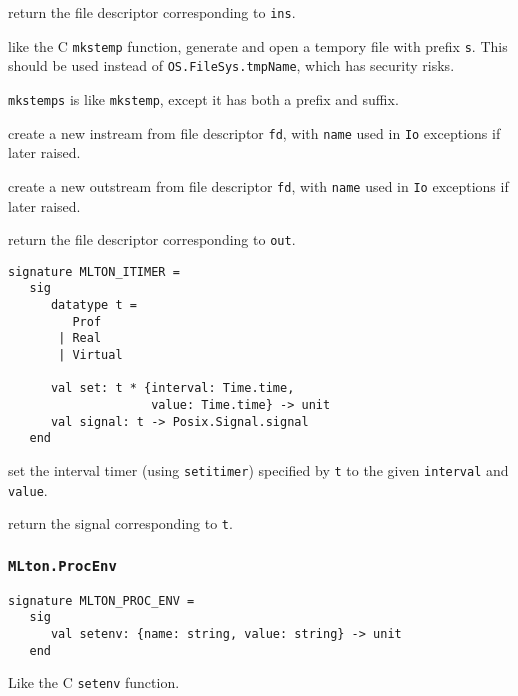 \begin{description}

 return the file descriptor corresponding to {\tt ins}.

like the C {\tt mkstemp} function, generate and open a tempory file with prefix
{\tt s}.  This should be used instead of {\tt OS.FileSys.tmpName}, which has
security risks.

{\tt mkstemps} is like {\tt mkstemp}, except it has both a prefix and suffix.

 create a new instream from file descriptor
{\tt fd}, with {\tt name} used in {\tt Io} exceptions if later
raised.

 create a new outstream from file descriptor
{\tt  fd}, with {\tt name} used in {\tt Io} exceptions if later
raised.

 return the file descriptor corresponding to
{\tt out}.
\end{description}


\begin{verbatim}
signature MLTON_ITIMER =
   sig
      datatype t =
         Prof
       | Real
       | Virtual

      val set: t * {interval: Time.time,
                    value: Time.time} -> unit
      val signal: t -> Posix.Signal.signal
   end
\end{verbatim}

\begin{description}
set the interval timer (using {\tt setitimer}) specified by {\tt t} to
the given {\tt interval} and {\tt value}.

return the signal corresponding to {\tt t}.
\end{description}

\subsubsection{\tt MLton.ProcEnv}
\begin{verbatim}
signature MLTON_PROC_ENV =
   sig
      val setenv: {name: string, value: string} -> unit
   end
\end{verbatim}

\begin{description}
Like the C {\tt setenv} function.
\end{description}

